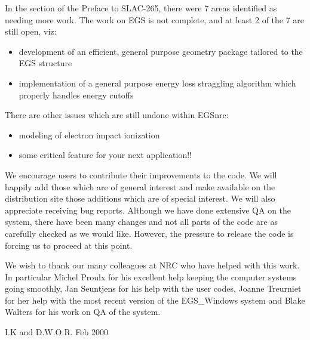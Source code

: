 In the section of the Preface to SLAC-265, there were 7 areas identified as
needing more work.  The work on EGS is not  complete, and at least 2 of
the 7 are still open, viz:
\begin{itemize}
\vspace{-4mm}
\item development of an efficient, general purpose geometry package
tailored to the EGS structure
\vspace{-3mm}
\item implementation of a general purpose energy loss straggling algorithm
which properly handles energy cutoffs
\end{itemize}

\vspace{-5mm}
There are other issues which are still undone within EGSnrc:
\vspace{-5mm}
\begin{itemize}
\item modeling of electron impact ionization
\vspace{-3mm}
\item some critical feature for your next application!!
\end{itemize}
We encourage users to contribute their improvements to the code. We will
happily add those which are of general interest and make available on the
distribution site those additions which are of special interest. We will
also appreciate receiving bug reports. Although we have done extensive QA
on the system, there have been many changes and not all parts of the code
are as carefully checked as we would like.  However, the pressure to release
the code is forcing us to proceed at this point.

We wish to thank our many colleagues at NRC who have helped with this work.
In particular Michel Proulx for his excellent help keeping the computer
systems going smoothly, Jan Seuntjens for his help with the user codes,
Joanne Treurniet for her help with the most recent version of the
EGS\_Windows system and Blake Walters for his work on QA of the system.

\noindent I.K and D.W.O.R.  \hfill Feb 2000 \vspace{1mm}\\

